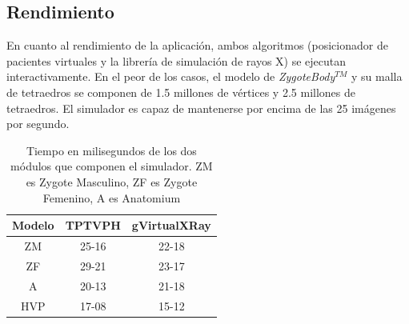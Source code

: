 
\subsection{Rendimiento}
En cuanto al rendimiento de la aplicación, ambos algoritmos (posicionador de pacientes virtuales y la librería de simulación de rayos X) se ejecutan interactivamente. En el peor de los casos, el modelo de \emph{ZygoteBody}$^{TM}$ y su malla de tetraedros se componen de 1.5 millones de vértices y 2.5 millones de tetraedros. El simulador es capaz de mantenerse por encima de las 25 imágenes por segundo. 

\begin{table}[h]
\centering
\caption{Tiempo en milisegundos de los dos módulos que componen el simulador. ZM es Zygote Masculino, ZF es Zygote Femenino, A es Anatomium }
\begin{tabular}{|c|c|c|}
\hline
\textbf{Modelo}&\textbf{TPTVPH} &\textbf{gVirtualXRay}  \\ 
\hline
ZM  & 25-16 & 22-18 \\ 
\hline
ZF  & 29-21  & 23-17    \\ 
\hline
A   & 20-13 & 21-18 \\ 
\hline
HVP   & 17-08 & 15-12 \\ 
\hline
\end{tabular}
\label{tab:xraytime}
\end{table}



